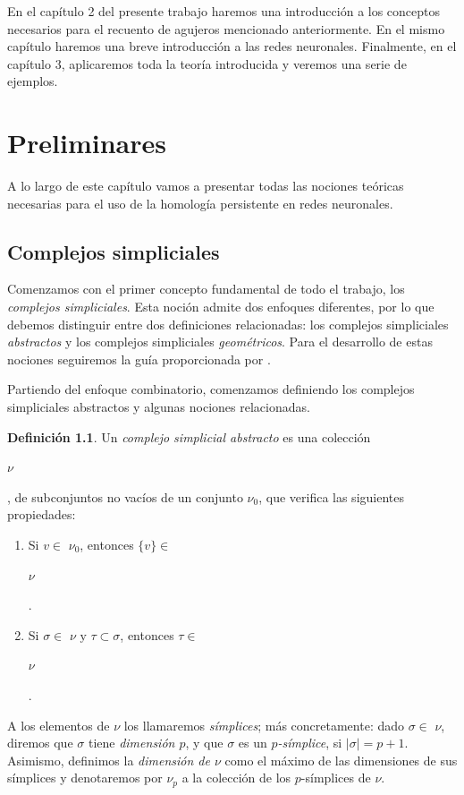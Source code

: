\documentclass[12pt, a4paper, twoside]{book}
\numberwithin{equation}{section}
\theoremstyle{definition}
\newtheorem{defi}{Definición}[section]
\theoremstyle{remark}
\theoremstyle{plain}
\begin{document}
	En el capítulo 2 del presente trabajo haremos una introducción a los 
	conceptos necesarios para el recuento de agujeros mencionado 
	anteriormente. En el mismo capítulo haremos una breve introducción a 
	las redes neuronales. Finalmente, en el capítulo 3, aplicaremos toda
	la teoría introducida y veremos una serie de ejemplos.
	
	\chapter{Preliminares}

	A lo largo de este capítulo vamos a presentar todas las nociones teóricas 
	necesarias para el uso de la homología persistente en redes neuronales.	
	
	\section{Complejos simpliciales}
	Comenzamos con el primer concepto fundamental de todo el trabajo, los 
	\emph{complejos simpliciales}. Esta noción admite dos enfoques 
	diferentes, por lo que debemos distinguir entre dos definiciones 
	relacionadas: los complejos simpliciales \emph{abstractos} y los 
	complejos simpliciales \emph{geométricos}. Para el desarrollo de estas 
	nociones seguiremos la guía proporcionada por 
	\cite{TopoAlg-Edelsbrunner,Intro-Otter}.

	Partiendo del enfoque combinatorio, comenzamos definiendo los complejos 
	simpliciales abstractos y algunas nociones relacionadas. 

	\begin{defi}
	
	Un \textit{complejo simplicial abstracto} es una colección 
	\begin{Large}$\nu$\end{Large}, de subconjuntos no vacíos de un 
	conjunto {\Large $\nu$}$_{0}$, que verifica las siguientes 
	propiedades:
	
	\begin{enumerate}
		\item Si $v \in $ {\Large $ \nu$}$_{0}$, entonces $\{v\} \in$
			\begin{Large}$ \nu$\end{Large}.
		\item Si $\sigma \in $ {\Large $ \nu$}$ \text{ y } \tau 
			\subset \sigma$, entonces $ \tau \in $
			\begin{Large}$ \nu$\end{Large}.
	\end{enumerate}
	
	A los elementos de {\Large $\nu$} los llamaremos \textit{símplices};
	más concretamente: dado $\sigma \in $ {\Large $\nu$}, diremos que 
	$\sigma$ tiene \textit{dimensión $p$}, y que $\sigma$ es un 
	\textit{$p$-símplice}, si $|\sigma|=p+1$. Asimismo, definimos la 
	\textit{dimensión de {\Large $\nu$}} como el máximo de las dimensiones 
	de sus símplices y denotaremos por {\Large $\nu$}$_{p}$ a la colección 
	de los $p$-símplices de {\Large $\nu$}.	
	
	\end{defi}
\end{document}
